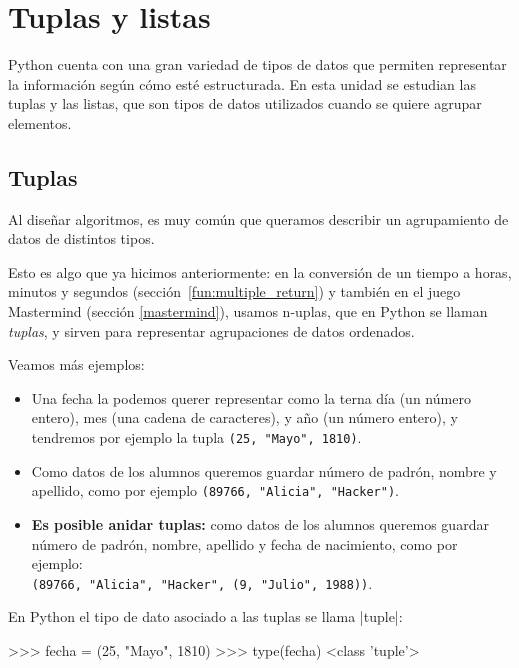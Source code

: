 \chapter{Tuplas y listas}

Python cuenta con una gran variedad de tipos de datos que permiten
representar la información según cómo esté estructurada.  En esta unidad se
estudian las tuplas y las listas, que son tipos de datos utilizados cuando
se quiere agrupar elementos.

\section{Tuplas}

Al diseñar algoritmos, es muy común que queramos describir un agrupamiento de
datos de distintos tipos.

Esto es algo que ya hicimos anteriormente: en la conversión de un tiempo a
horas, minutos y segundos (sección~\ref{fun:multiple_return}) y también en el
juego Mastermind (sección \ref{mastermind}), usamos n-uplas, que en Python se
llaman \emph{tuplas}, y sirven para representar agrupaciones de datos ordenados.

Veamos más ejemplos:

\begin{itemize}

\item Una fecha la podemos querer representar como la terna día (un número
entero), mes (una cadena de caracteres), y año (un número entero), y
tendremos por ejemplo la tupla \lstinline!(25, "Mayo", 1810)!.

\item Como datos de los alumnos queremos guardar número de padrón, nombre y
apellido, como por ejemplo \lstinline!(89766, "Alicia", "Hacker")!.

\item {\bf Es posible anidar tuplas:} como datos de los alumnos
queremos guardar número de padrón, nombre, apellido y fecha de nacimiento,
como por ejemplo: \\
\lstinline!(89766, "Alicia", "Hacker", (9, "Julio", 1988))!.
\end{itemize}

\begin{observacion}
En Python el tipo de dato asociado a las tuplas se llama |tuple|:

\begin{codigo-python-sn}
>>> fecha = (25, "Mayo", 1810)
>>> type(fecha)
<class 'tuple'>
\end{codigo-python-sn}
\end{observacion}

